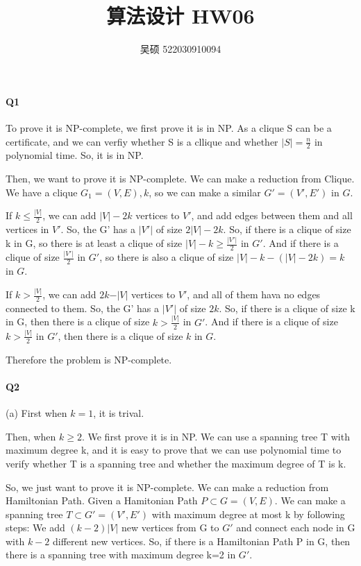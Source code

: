 \documentclass[UTF8]{ctexart}
\renewcommand{\(}{\left(}
\renewcommand{\)}{\right)}
\begin{document}
\title{算法设计 HW06}  
\author{吴硕 522030910094}
\maketitle

\paragraph{Q1} 

To prove it is NP-complete, we first prove it is in NP. As a clique S can be a certificate, and we
can verfiy whether S is a cllique and whether $\vert S \vert = \frac{n}{2}$ in polynomial time. So, it is in NP.

Then, we want to prove it is NP-complete. We can make a reduction from Clique. 
We have a clique $G_{1} = (V, E), k$, so we can make a similar $G' = (V', E')$ in $G$.

If $k \leq \frac{\vert V \vert}{2}$, we can add $\vert V \vert - 2k$ vertices to $V'$, and add edges between them and all vertices in $V'$.
So, the G' has a $\vert V' \vert$ of size $2\vert V \vert - 2k$. So, if there is a clique of size k in G,
so there is at least a clique of size $\vert V \vert - k \geq \frac{\vert V' \vert}{2}$ in $G'$. And if there is a 
clique of size $\frac{\vert V' \vert}{2}$ in $G'$, so there is also a clique of size $\vert V \vert - k -(\vert V \vert -2k) = k$ in $G$.

If $k > \frac{\vert V \vert}{2}$, we can add $2k - \vert V \vert$ vertices to $V'$, and all of them hava no edges connected to them.
So, the G' has a $\vert V' \vert$ of size $2k$. So, if there is a clique of size k in G, then there is a clique of size $k > \frac{\vert V \vert}{2}$ in $G'$.
And if there is a clique of size $k > \frac{\vert V \vert}{2}$ in $G'$, then there is a clique of size $k$ in $G$.

Therefore the problem is NP-complete.

\paragraph{Q2}

(a) First when $k = 1$, it is trival.

Then, when $k \geq 2$. We first prove it is in NP. We can use a spanning tree T with maximum degree k, and
it is easy to prove that we can use polynomial time to verify whether T is a spanning tree and whether the maximum degree of T is k.

So, we just want to prove it is NP-complete. We can make a reduction from Hamiltonian Path. Given a Hamitonian Path $P \subset G= (V, E)$.
We can make a spanning tree $T \subset G' = (V', E')$ with maximum degree at most k by following steps: We add $(k-2)\vert V \vert$ new vertices
from G to $G'$ and connect each node in G with $k-2$ different new vertices. So, if there is a Hamiltonian Path P in G, then there is a spanning tree with maximum degree k=2 in $G'$.
\end{document}
